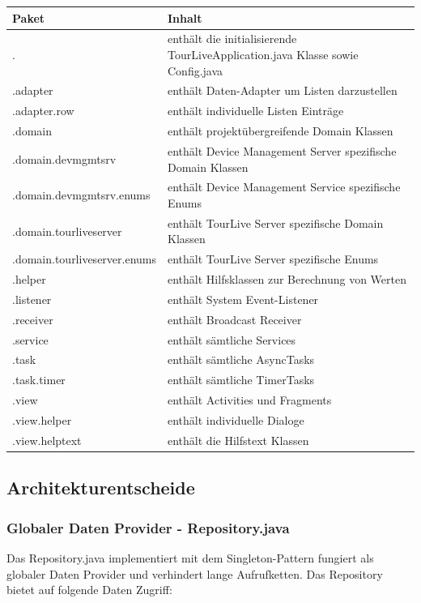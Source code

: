 \begin{longtable}{p{5.0cm} | p{7.1cm}}
\textbf{Paket} & \textbf{Inhalt} \\
\hline \hline 
. & enthält die initialisierende TourLiveApplication.java Klasse sowie Config.java \\ 
\hline 
.adapter & enthält Daten-Adapter um Listen darzustellen \\ 
\hline 
.adapter.row & enthält individuelle Listen Einträge \\ 
\hline 
.domain & enthält projektübergreifende Domain Klassen \\ 
\hline 
.domain.devmgmtsrv & enthält Device Management Server spezifische Domain Klassen \\ 
\hline 
.domain.devmgmtsrv.enums & enthält Device Management Service spezifische Enums \\ 
\hline 
.domain.tourliveserver & enthält TourLive Server spezifische Domain Klassen \\ 
\hline 
.domain.tourliveserver.enums & enthält TourLive Server spezifische Enums \\  
\hline 
.helper & enthält Hilfsklassen zur Berechnung von Werten \\ 
\hline 
.listener & enthält System Event-Listener \\ 
\hline 
.receiver & enthält Broadcast Receiver \\ 
\hline 
.service & enthält sämtliche Services \\ 
\hline 
.task & enthält sämtliche AsyncTasks \\ 
\hline 
.task.timer & enthält sämtliche TimerTasks \\ 
\hline 
.view & enthält Activities und Fragments \\ 
\hline 
.view.helper & enthält individuelle Dialoge \\ 
\hline 
.view.helptext & enthält die Hilfstext Klassen \\ 
\hline 
\end{longtable} 

\subsection{Architekturentscheide}

\subsubsection{Globaler Daten Provider - Repository.java}
Das Repository.java implementiert mit dem Singleton-Pattern fungiert als globaler Daten Provider und verhindert lange Aufrufketten. Das Repository bietet auf folgende Daten Zugriff:

